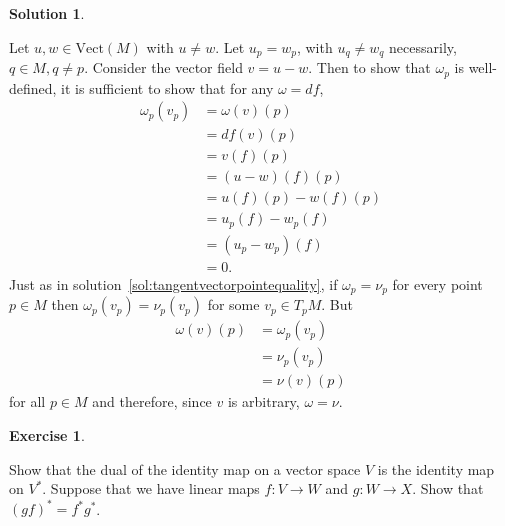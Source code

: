 \documentclass[11pt, a4paper]{report}
\theoremstyle{definition}
\newtheorem{ex}{Exercise}[part]
\newtheorem{sol}{Solution}[part]
\begin{document}
\begin{sol}\label{sol:welldefined1forms}

Let $u, w \in \text{Vect}(M)$ with $u \neq w$. Let $u_p = w_p$, with $u_q \neq w_q$ necessarily, $q \in M, q \neq p$.
Consider the vector field $v = u - w$. Then to show that $\omega_p$ is well-defined, it is sufficient to show that for any $\omega = df$,
\begin{align*}
    \omega_p(v_p) &= \omega(v)(p) \\
                  &= df(v)(p) \\
                  &= v(f)(p) \\
                  &= (u - w)(f)(p) \\
                  &= u(f)(p) - w(f)(p) \\
                  &= u_p(f) - w_p(f) \\
                  &= (u_p - w_p)(f) \\
                  &= 0.
\end{align*}
Just as in solution~\ref{sol:tangentvectorpointequality}, if $\omega_p = \nu_p$ for every point $p \in M$ then $\omega_p(v_p) = \nu_p(v_p)$ for some $v_p \in T_p M$. But
\begin{align*}
\omega (v)(p) &= \omega_p(v_p) \\
              &= \nu_p(v_p) \\
              &= \nu (v)(p)
\end{align*}
for all $p \in M$ and therefore, since $v$ is arbitrary, $\omega = \nu$.

\end{sol}

\begin{ex}\label{ex:dualidentity}

Show that the dual of the identity map on a vector space $V$ is the identity map on $V^*$.
Suppose that we have linear maps $f: V \to W$ and $g: W \to X$. Show that ${(gf)}^* = f^* g^*$.

\end{ex}
\end{document}
